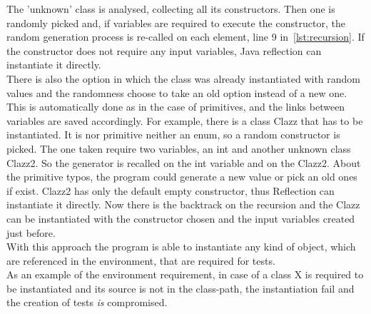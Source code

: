 The 'unknown' class is analysed, collecting all its constructors.
Then one is randomly picked and, if variables are required to execute the constructor, the random generation process is re-called on each element, line 9 in~\ref{lst:recursion}.
If the constructor does not require any input variables, Java reflection can instantiate it directly.\\
There is also the option in which the class was already instantiated with random values and the randomness choose to take an old option instead of a new one.
This is automatically done as in the case of primitives, and the links between variables are saved accordingly.
For example, there is a class Clazz that has to be instantiated.
It is nor primitive neither an enum, so a random constructor is picked.
The one taken require two variables, an int and another unknown class Clazz2.
So the generator is recalled on the int variable and on the Clazz2.
About the primitive typos, the program could generate a new value or pick an old ones if exist.
Clazz2 has only the default empty constructor, thus Reflection can instantiate it directly.
Now there is the backtrack on the recursion and the Clazz can be instantiated with the constructor chosen and the input variables created just before.\\
With this approach the program is able to instantiate any kind of object, which are referenced in the environment, that are required for tests.\\
As an example of the environment requirement, in case of a class X is required to be instantiated and its source is not in the class-path, the instantiation fail and the creation of tests \emph{is} compromised.
